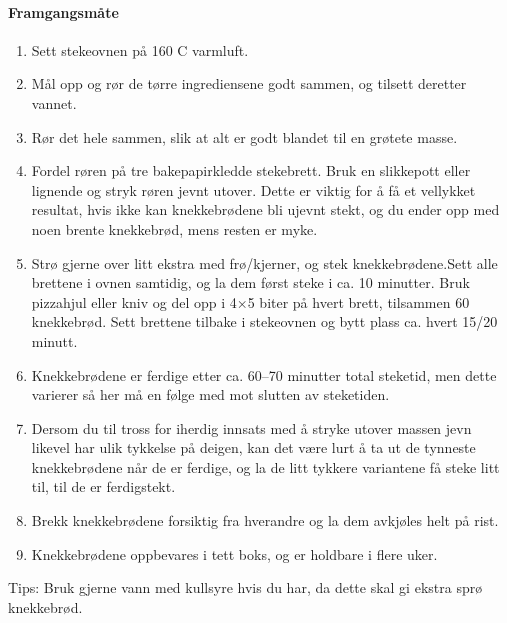 \paragraph{Framgangsmåte}
\begin{enumerate}[noitemsep]
	\item Sett stekeovnen på 160 \degree C varmluft.
	\item Mål opp og rør de tørre ingrediensene godt sammen, og tilsett deretter vannet.
	\item Rør det hele sammen, slik at alt er godt blandet til en grøtete masse.
	\item Fordel røren på tre bakepapirkledde stekebrett. Bruk en slikkepott eller lignende og stryk røren jevnt utover. Dette er viktig for å få et vellykket resultat, hvis ikke kan knekkebrødene bli ujevnt stekt, og du ender opp med noen brente knekkebrød, mens resten er myke.
	\item Strø gjerne over litt ekstra med frø/kjerner, og stek knekkebrødene.Sett alle brettene i ovnen samtidig, og la dem først steke i ca. 10 minutter. Bruk pizzahjul eller kniv og del opp i 4×5 biter på hvert brett, tilsammen 60 knekkebrød. Sett brettene tilbake i stekeovnen og bytt plass ca. hvert 15/20 minutt.
	\item Knekkebrødene er ferdige etter ca. 60--70 minutter total steketid, men dette varierer så her må en følge med mot slutten av steketiden.
	\item Dersom du til tross for iherdig innsats med å stryke utover massen jevn likevel har ulik tykkelse på deigen, kan det være lurt å ta ut de tynneste knekkebrødene når de er ferdige, og la de litt tykkere variantene få steke litt til, til de er ferdigstekt.
	\item Brekk knekkebrødene forsiktig fra hverandre og la dem avkjøles helt på rist.
	\item Knekkebrødene oppbevares i tett boks, og er holdbare i flere uker.
\end{enumerate}



Tips: Bruk gjerne vann med kullsyre hvis du har, da dette skal gi ekstra sprø knekkebrød.
